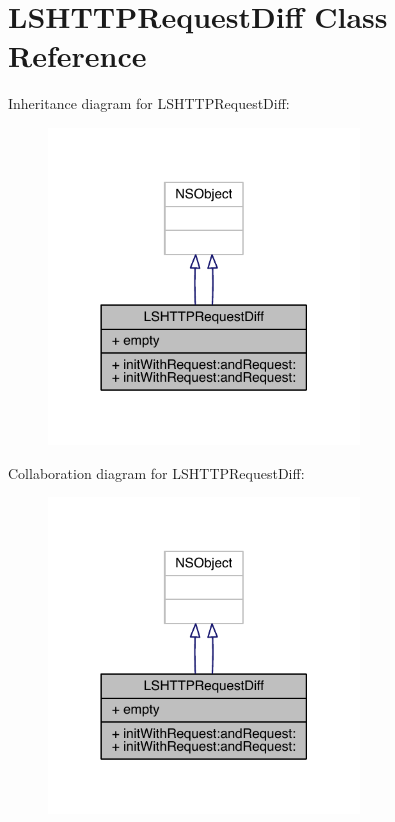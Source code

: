 \hypertarget{interface_l_s_h_t_t_p_request_diff}{\section{L\-S\-H\-T\-T\-P\-Request\-Diff Class Reference}
\label{interface_l_s_h_t_t_p_request_diff}
}


Inheritance diagram for L\-S\-H\-T\-T\-P\-Request\-Diff\-:\nopagebreak
\begin{figure}[H]
\begin{center}
\leavevmode
\includegraphics[width=234pt]{interface_l_s_h_t_t_p_request_diff__inherit__graph}
\end{center}
\end{figure}


Collaboration diagram for L\-S\-H\-T\-T\-P\-Request\-Diff\-:\nopagebreak
\begin{figure}[H]
\begin{center}
\leavevmode
\includegraphics[width=234pt]{interface_l_s_h_t_t_p_request_diff__coll__graph}
\end{center}
\end{figure}
